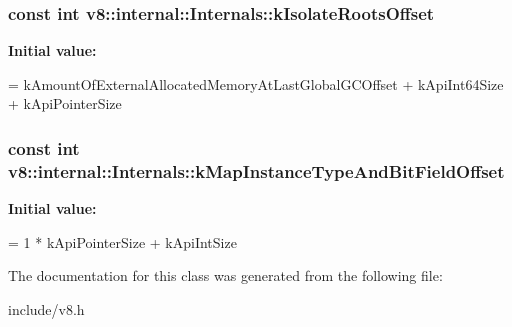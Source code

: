\subsubsection[{\texorpdfstring{k\+Isolate\+Roots\+Offset}{kIsolateRootsOffset}}]{\setlength{\rightskip}{0pt plus 5cm}const int v8\+::internal\+::\+Internals\+::k\+Isolate\+Roots\+Offset\hspace{0.3cm}{\ttfamily [static]}}\hypertarget{classv8_1_1internal_1_1_internals_a3142f942a25203ce7fca0e9a4563c74d}{}\label{classv8_1_1internal_1_1_internals_a3142f942a25203ce7fca0e9a4563c74d}
{\bfseries Initial value\+:}
\begin{DoxyCode}
=
      kAmountOfExternalAllocatedMemoryAtLastGlobalGCOffset + kApiInt64Size +
      kApiPointerSize
\end{DoxyCode}
\subsubsection[{\texorpdfstring{k\+Map\+Instance\+Type\+And\+Bit\+Field\+Offset}{kMapInstanceTypeAndBitFieldOffset}}]{\setlength{\rightskip}{0pt plus 5cm}const int v8\+::internal\+::\+Internals\+::k\+Map\+Instance\+Type\+And\+Bit\+Field\+Offset\hspace{0.3cm}{\ttfamily [static]}}\hypertarget{classv8_1_1internal_1_1_internals_aeda3ec9bc2906bf6162b9cf3df9fd94a}{}\label{classv8_1_1internal_1_1_internals_aeda3ec9bc2906bf6162b9cf3df9fd94a}
{\bfseries Initial value\+:}
\begin{DoxyCode}
=
      1 * kApiPointerSize + kApiIntSize
\end{DoxyCode}


The documentation for this class was generated from the following file\+:\begin{DoxyCompactItemize}
\item 
include/v8.\+h\end{DoxyCompactItemize}
